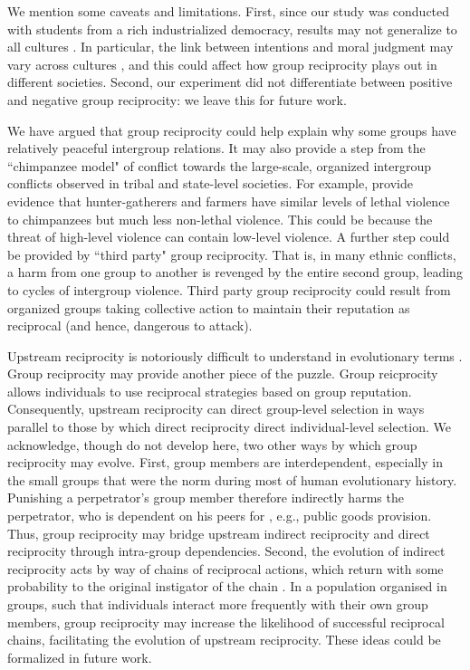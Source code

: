 \documentclass[12pt,a4paper]{article}\usepackage[]{graphicx}\usepackage[]{color}
\begin{document}
We mention some caveats and limitations.
First, since our study was conducted with students from a rich industrialized democracy, results may not generalize to all cultures \citep{henrich2010most}. In particular, the link between intentions and moral judgment may vary across cultures \citep{barrett2016small}, and this could affect how group reciprocity plays out in different societies. Second, our experiment did not differentiate between positive and
negative group reciprocity: we leave this for future work.


We have argued that group reciprocity could help explain why some groups have relatively peaceful intergroup relations. It may
also provide a step from the ``chimpanzee model" of conflict towards the large-scale, organized intergroup conflicts
observed in tribal and state-level societies. For example, \citet{wrangham2006comparative} provide evidence that hunter-gatherers
and farmers have similar
levels of lethal violence to chimpanzees but much less non-lethal violence. This could be because the threat of
high-level violence
can contain low-level violence. A further step could be provided by ``third party" group reciprocity. That
is, in many ethnic conflicts, a harm from one group to another is revenged by the entire second group, leading to
cycles of intergroup violence. Third party group reciprocity could result from organized groups taking collective
action to maintain their reputation as reciprocal (and hence, dangerous to attack).

Upstream reciprocity is notoriously difficult to understand in evolutionary
terms \citep{boyd1989evolution,nowak2007upstream}. Group reciprocity may provide another piece of
the puzzle. Group reicprocity allows individuals to use reciprocal strategies based on group
reputation. Consequently, upstream reciprocity can direct group-level selection in ways parallel
to those by which direct reciprocity direct individual-level selection.
We acknowledge, though do not develop here, two other ways by which group reciprocity may evolve.
First, group members are interdependent, especially in the small groups that were the norm during most of human evolutionary
history. Punishing a perpetrator's group member therefore indirectly harms the perpetrator, who is dependent on his peers for
, e.g., public goods provision. Thus, group reciprocity may bridge upstream indirect reciprocity and direct reciprocity
through intra-group dependencies. Second, the evolution of indirect reciprocity acts by way of chains
of reciprocal actions, which return with some probability to the original
instigator of the chain \citep{nowak2007upstream}. In a population
organised in groups, such that individuals interact more frequently with
their own group members, group reciprocity may increase the likelihood
of successful reciprocal chains, facilitating the evolution of upstream
reciprocity. These ideas could be formalized in future work.
\end{document}
